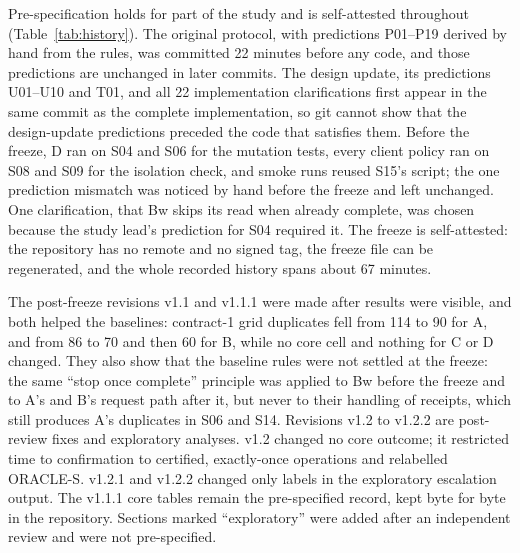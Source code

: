 \documentclass[11pt]{article}
\begin{document}
Pre-specification holds for part of the study and is self-attested throughout (Table~\ref{tab:history}). The original protocol, with predictions P01--P19 derived by hand from the rules, was committed 22 minutes before any code, and those predictions are unchanged in later commits. The design update, its predictions U01--U10 and T01, and all 22 implementation clarifications first appear in the same commit as the complete implementation, so git cannot show that the design-update predictions preceded the code that satisfies them. Before the freeze, D ran on S04 and S06 for the mutation tests, every client policy ran on S08 and S09 for the isolation check, and smoke runs reused S15's script; the one prediction mismatch was noticed by hand before the freeze and left unchanged. One clarification, that Bw skips its read when already complete, was chosen because the study lead's prediction for S04 required it. The freeze is self-attested: the repository has no remote and no signed tag, the freeze file can be regenerated, and the whole recorded history spans about 67 minutes.

The post-freeze revisions v1.1 and v1.1.1 were made after results were visible, and both helped the baselines: contract-1 grid duplicates fell from 114 to 90 for A, and from 86 to 70 and then 60 for B, while no core cell and nothing for C or D changed. They also show that the baseline rules were not settled at the freeze: the same ``stop once complete'' principle was applied to Bw before the freeze and to A's and B's request path after it, but never to their handling of receipts, which still produces A's duplicates in S06 and S14. Revisions v1.2 to v1.2.2 are post-review fixes and exploratory analyses. v1.2 changed no core outcome; it restricted time to confirmation to certified, exactly-once operations and relabelled ORACLE-S. v1.2.1 and v1.2.2 changed only labels in the exploratory escalation output. The v1.1.1 core tables remain the pre-specified record, kept byte for byte in the repository. Sections marked ``exploratory'' were added after an independent review and were not pre-specified.
\end{document}
